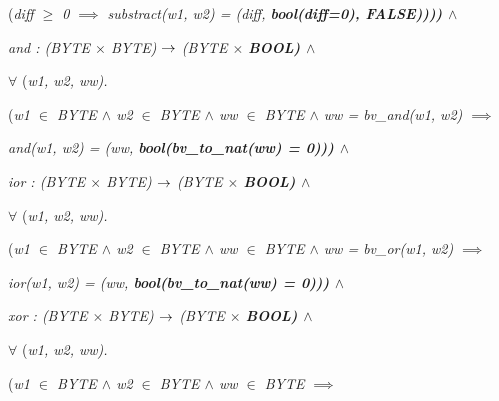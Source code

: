 \begin{sloppypar}
\hspace*{0.45in}\rm (\it diff  $\geq$  \rm 0  $\implies$  \it substract\rm (\it w1\rm , \it w2\rm ) \rm = \rm (\it diff\rm , \bf bool\rm (\it diff\rm =\rm 0\rm )\rm , \bf FALSE\rm )\rm )\rm )\rm )  $\land$  

\hspace*{0.20in}\it and \rm : \rm (\it BYTE  $\times$  \it BYTE\rm )  $\rightarrow$  \rm (\it BYTE  $\times$  \bf BOOL\rm )  $\land$  

\hspace*{0.20in} $\forall$  \rm (\it w1\rm , \it w2\rm , \it ww\rm )\rm .

\hspace*{0.30in}\rm (\it w1  $\in$  \it BYTE  $\land$  \it w2  $\in$  \it BYTE  $\land$  \it ww  $\in$  \it BYTE  $\land$  \it ww \rm = \it bv\_and\rm (\it w1\rm , \it w2\rm )  $\implies$ 

\hspace*{0.60in}\it and\rm (\it w1\rm , \it w2\rm ) \rm = \rm (\it ww\rm , \bf bool\rm (\it bv\_to\_nat\rm (\it ww\rm ) \rm = \rm 0\rm )\rm )\rm )  $\land$  

\hspace*{0.20in}\it ior \rm : \rm (\it BYTE  $\times$  \it BYTE\rm )  $\rightarrow$  \rm (\it BYTE  $\times$  \bf BOOL\rm )  $\land$  

\hspace*{0.20in} $\forall$  \rm (\it w1\rm , \it w2\rm , \it ww\rm )\rm .

\hspace*{0.30in}\rm (\it w1  $\in$  \it BYTE  $\land$  \it w2  $\in$  \it BYTE  $\land$  \it ww  $\in$  \it BYTE  $\land$  \it ww \rm = \it bv\_or\rm (\it w1\rm , \it w2\rm )  $\implies$ 

\hspace*{0.60in}\it ior\rm (\it w1\rm , \it w2\rm ) \rm = \rm (\it ww\rm , \bf bool\rm (\it bv\_to\_nat\rm (\it ww\rm ) \rm = \rm 0\rm )\rm )\rm )  $\land$  

\hspace*{0.20in}\it xor \rm : \rm (\it BYTE  $\times$  \it BYTE\rm )  $\rightarrow$  \rm (\it BYTE  $\times$  \bf BOOL\rm )  $\land$  

\hspace*{0.20in} $\forall$  \rm (\it w1\rm , \it w2\rm , \it ww\rm )\rm .

\hspace*{0.30in}\rm (\it w1  $\in$  \it BYTE  $\land$  \it w2  $\in$  \it BYTE  $\land$  \it ww  $\in$  \it BYTE  $\implies$ 


\end{sloppypar}
